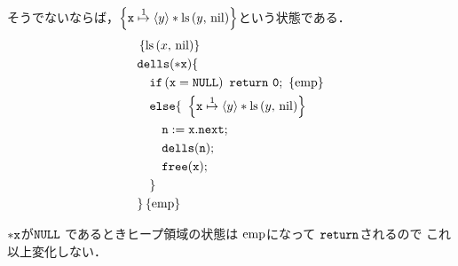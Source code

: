 \documentclass[a4paper, 10pt]{ltjsarticle}
\begin{document}
  そうでないならば，$\left\{ \mathtt{x} \mathrel{\overset{1}{\mapsto}} \left\langle y \right\rangle * \mathop{\mathrm{ls}}\left(y{,}\ \mathrm{nil}\right) \right\}$という状態である．
  \begin{align*}
   &  \left\{\mathprls{x}{\mathvalnil}\right\}\\
   & \mathprogramsy{dells(*x)} \{  \\
   &\quad \mathprogramsy{if\left(x = NULL\right)\ return\ 0;}\ \left\{\mathemp\right\}
   \\
     &\quad   \mathprogramsy{else \{}\  
   \left\{ \mathprogramsy{x} \mathpointer{1} \left\langle y \right\rangle * \mathprls{y}{\mathvalnil}  \right\} \\
     &\qquad  \mathprogramsy{n := x.next;}  %
   \\
     &\qquad  \mathprogramsy{dells(n);}  %
   \\
      &\qquad  \mathprogramsy{free(x);}   %
   \\
      &\quad \mathprogramsy{\}} %
   \\
      &\mathprogramsy{\}} \left\{\mathemp\right\}
  \end{align*}

  $\mathtt{*x}$が$\mathtt{NULL}$
  であるときヒープ領域の状態は
  $\mathrm{emp}$になって
  $\mathtt{return}$されるので
  これ以上変化しない．
\end{document}
